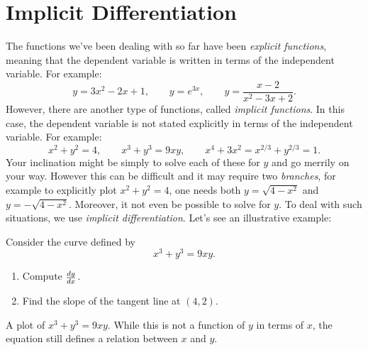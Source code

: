 \section{Implicit Differentiation}

The functions we've been dealing with so far have been
\textit{explicit functions}, meaning that the
dependent variable is written in terms of the independent variable. For
example:
\[
y=3x^2-2x+1,\qquad y=e^{3x}, \qquad y = \frac{x-2}{x^2-3x+2}.
\]
However, there are another type of functions, called \textit{implicit functions}. In this case, the dependent
variable is not stated explicitly in terms of the independent
variable. For example:
\[
x^2+y^2 = 4,\qquad x^3+y^3 = 9xy, \qquad x^4+3x^2 = x^{2/3}+y^{2/3} = 1.
\]
Your inclination might be simply to solve each of these for $y$ and go
merrily on your way. However this can be difficult and it may require
two \textit{branches}, for example to explicitly plot $x^2+y^2 = 4$,
one needs both $y= \sqrt{4-x^2}$ and $y=-\sqrt{4-x^2}$. Moreover, it
not even be possible to solve for $y$. To deal with such situations,
we use \textit{implicit
  differentiation}. Let's see an illustrative example:


\begin{example}
Consider the curve defined by
\[
x^3+y^3 = 9xy.
\]
\begin{enumerate}
\item Compute $\frac{dy}{dx}$.
\item Find the slope of the tangent line at $(4,2)$.
\end{enumerate}
\end{example}


\begin{marginfigure}
\caption{A plot of $x^3+y^3 = 9xy$. While this is not a function of
  $y$ in terms of $x$, the equation still defines a relation between
  $x$ and $y$.}
\end{marginfigure}


